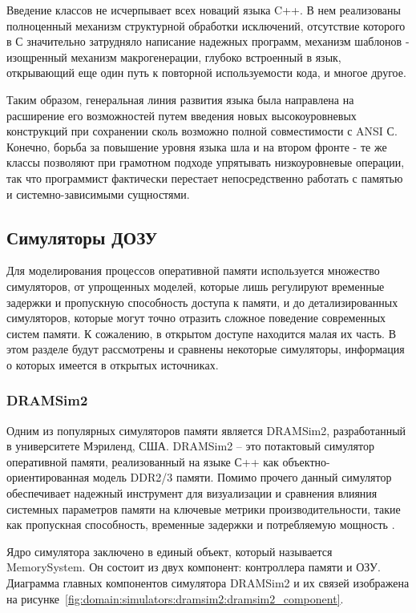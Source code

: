 Введение классов не исчерпывает всех новаций языка C++. В нем реализованы полноценный механизм структурной обработки исключений, отсутствие которого в С значительно затрудняло написание надежных программ, механизм шаблонов - изощренный механизм макрогенерации, глубоко встроенный в язык, открывающий еще один путь к повторной используемости кода, и многое другое.

Таким образом, генеральная линия развития языка была направлена на расширение его возможностей путем введения новых высокоуровневых конструкций при сохранении сколь возможно полной совместимости с ANSI С. Конечно, борьба за повышение уровня языка шла и на втором фронте - те же классы позволяют при грамотном подходе упрятывать низкоуровневые операции, так что программист фактически перестает непосредственно работать с памятью и системно-зависимыми сущностями.

\subsection{Симуляторы ДОЗУ}
\label{sub:domain:simulators}
Для моделирования процессов оперативной памяти используется множество симуляторов, от упрощенных моделей, которые лишь регулируют временные задержки и пропускную способность доступа к памяти, и до детализированных симуляторов, которые могут точно отразить сложное поведение современных систем памяти. К сожалению, в открытом доступе находится малая их часть. В этом разделе будут рассмотрены и сравнены некоторые симуляторы, информация о которых имеется в открытых источниках.

\subsubsection{DRAMSim2}
\label{sub:domain:simulators:dramsim2}
Одним из популярных симуляторов памяти является DRAMSim2, разработанный в университете Мэриленд, США. 
DRAMSim2 – это потактовый симулятор оперативной памяти, реализованный на языке С++ как объектно-ориентированная модель DDR2/3 памяти. Помимо прочего данный симулятор обеспечивает надежный инструмент для визуализации и сравнения влияния системных параметров памяти на ключевые метрики производительности, такие как пропускная способность, временные задержки и потребляемую мощность \cite{dramsim2_article}.

Ядро симулятора заключено в единый объект, который называется MemorySystem. Он состоит из двух компонент: контроллера памяти и ОЗУ. Диаграмма главных компонентов симулятора DRAMSim2 и их связей изображена на рисунке~\ref{fig:domain:simulators:dramsim2:dramsim2_component}. 

